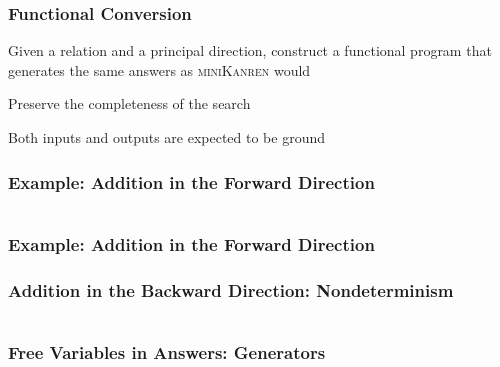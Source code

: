 \documentclass[xcolor=table, aspectratio=169]{beamer}
\newcommand{\mk}{\textsc{miniKanren}\xspace}
\begin{document}
\begin{frame}[fragile]
  \frametitle{Functional Conversion}
\begin{center}
  Given a relation and a principal direction, construct a functional program that generates the same answers as \mk would
\end{center}

\vfill

\begin{center}
  Preserve the completeness of the search
\end{center}

\vfill

\begin{center}
Both inputs and outputs are expected to be ground
\end{center}
\end{frame}

\lstset{basicstyle=\small}

\begin{frame}[fragile]
  \frametitle{Example: Addition in the Forward Direction}
\begin{columns}
  \begin{column}[t]{0.49\textwidth}
    
  \end{column}
  \begin{column}[t]{0.49\textwidth}
    
  \end{column}
\end{columns}
\end{frame}

\begin{frame}[fragile]
  \frametitle{Example: Addition in the Forward Direction}
     
\end{frame}

\begin{frame}[fragile]
  \frametitle{Addition in the Backward Direction: Nondeterminism}
\begin{columns}
  \begin{column}[t]{0.49\textwidth}
    
  \end{column}
  \begin{column}[t]{0.49\textwidth}
    
  \end{column}
\end{columns}
\end{frame}

\begin{frame}[fragile]
  \frametitle{Free Variables in Answers: Generators}
\begin{columns}
  \begin{column}[t]{0.49\textwidth}
    
  \end{column}
  \begin{column}[t]{0.49\textwidth}
    
  \end{column}
\end{columns}
\end{frame}
\end{document}
